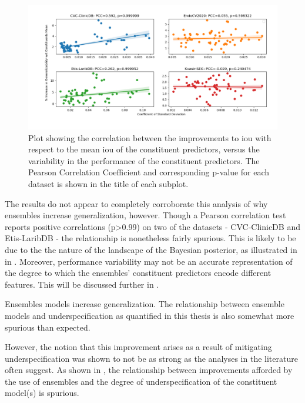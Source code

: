 \begin{figure}[h]
    \centering
    \hspace*{-1.9cm}\includegraphics[width=1.2\linewidth]{illustrations/ensemble_variance_relationship_statistical.png}
    \caption[Relationship between ensemble improvements and constituents' performance variability]{Plot showing the correlation between the improvements to \gls{iou} with respect to the mean \gls{iou} of the constituent predictors, versus the variability in the performance of the constituent predictors. The Pearson Correlation Coefficient and corresponding p-value for each dataset is shown in the title of each subplot.}
    \label{fig:ensemble_var}
\end{figure}

The results do not appear to completely corroborate this analysis of why ensembles increase generalization, however. Though a Pearson correlation test reports positive correlations (p>0.99) on two of the datasets - CVC-ClinicDB and Etis-LaribDB - the relationship is nonetheless fairly spurious. This is likely to be due to the the nature of the landscape of the Bayesian posterior, as illustrated in  in . Moreover, performance variability may not be an accurate representation of the degree to which the ensembles' constituent predictors encode different features. This will be discussed further in . 

    \item Ensembles models increase generalization. The relationship between ensemble models and underspecification as quantified in this thesis is also somewhat more spurious than expected.
    
    However, the notion that this improvement arises as a result of mitigating underspecification was shown to not be as strong as the analyses in the literature often suggest. As shown in , the relationship between improvements afforded by the use of ensembles and the degree of underspecification of the constituent model(s) is spurious. 
    
